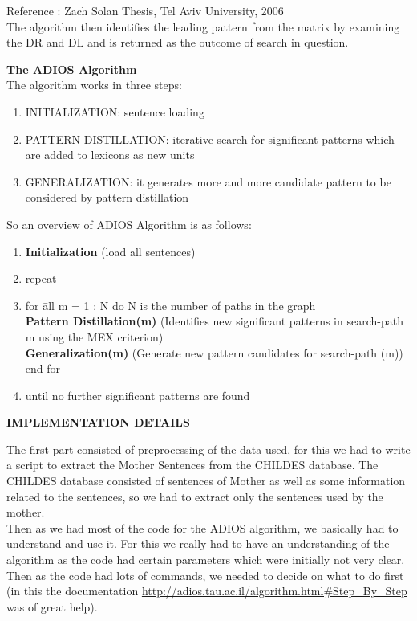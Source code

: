\def\DevnagVersion{2.15}\documentclass[14 pt]{article}
\begin{document}
\hfill {\scriptsize Reference : Zach Solan Thesis, Tel Aviv University, 2006}\\

The algorithm then identifies the leading pattern from the matrix by examining the DR and DL and is returned as the outcome of search in question.

{\large \bf The ADIOS Algorithm}
\\The algorithm works in three steps:
\begin{enumerate}
 \item INITIALIZATION: sentence loading
 \item PATTERN DISTILLATION: iterative search for significant patterns which are added to lexicons as new units
 \item GENERALIZATION: it generates more and more candidate pattern to be considered by pattern distillation
\end{enumerate} 
So an overview of ADIOS Algorithm is as follows:
\begin{enumerate}
\item {\bf Initialization} (load all sentences)
\item repeat
\item
\begin{tabbing}
 	for \= all m = 1 : N do {N is the number of paths in the graph}\\
	\> {\bf Pattern Distillation(m)} (Identifies new significant 	patterns in search-path m using the MEX criterion) 	\\
	\>	{\bf Generalization(m)} (Generate new pattern candidates for search-path (m))\\
	end for
\end{tabbing}
\item until no further significant patterns are found
\end{enumerate}


{\large \center \bf IMPLEMENTATION DETAILS\\}

The first part consisted of preprocessing of the data used, for this
we had to write a script to extract the Mother Sentences from the
CHILDES database. The CHILDES database consisted of sentences
of Mother as well as some information related to the sentences, so
we had to extract only the sentences used by the mother. \\

Then as we had most of the code for the ADIOS algorithm, we basically had
to understand and use it. For this we really had to have an
understanding of the algorithm as the code had certain parameters
which were initially not very clear. Then as the code had lots of
commands, we needed to decide on what to do first (in this the
documentation \url{http://adios.tau.ac.il/algorithm.html#Step_By_Step}
was of great help).\\
\end{document}
